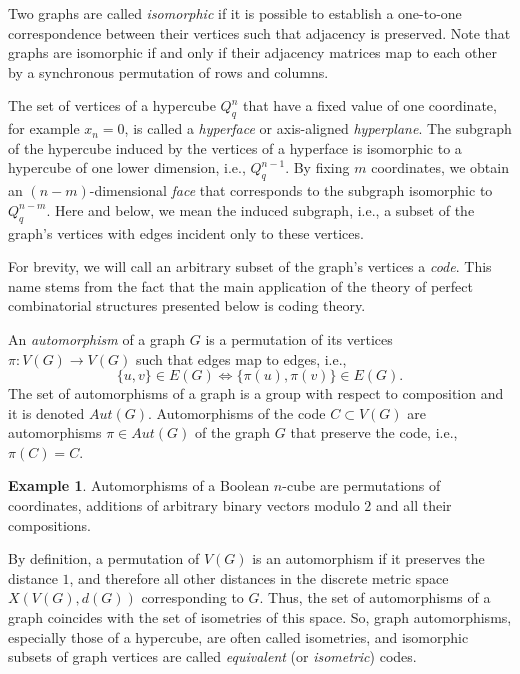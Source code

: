 \documentclass[11pt]{article}
\theoremstyle{definition}
\newtheorem{example}{Example}[section]
\begin{document}
Two graphs are called {\sl isomorphic} if it is possible to establish
a one-to-one correspondence between their vertices such that
adjacency is preserved. 
Note that graphs are isomorphic if and only if their adjacency matrices map to each other by a synchronous permutation of rows and columns.

The set of vertices of a hypercube $Q_q^n$ that have a fixed value
of one coordinate, for example $x_n=0$, is called a {\sl hyperface} or axis-aligned {\sl hyperplane}.
The subgraph of the hypercube induced by the vertices of a hyperface is isomorphic
to a hypercube of one lower dimension, i.e., $Q_q^{n-1}$.
By fixing $m$ coordinates, we obtain an $(n-m)$-dimensional  {\sl face} that corresponds to the subgraph isomorphic to 
$Q^{n-m}_q$. Here and below,
we mean the induced subgraph, i.e., a subset of the graph's vertices
with edges  incident only to these vertices.

For brevity, we will call an arbitrary subset of the graph's vertices
a {\sl code}. This name stems from the fact that the main
application of the theory of perfect combinatorial structures presented below is
coding theory.


An {\sl automorphism} of a graph $G$ is a permutation of its
vertices $\pi:V(G)\rightarrow V(G)$ such that edges map to
edges, i.e., $$\{u,v\}\in E(G) \Leftrightarrow \{\pi(u),\pi(v)\}\in
E(G).$$%
The set of automorphisms of a graph is a group with respect to composition  and it is denoted
$Aut(G)$.
{Automorphisms of the code} $C\subset V(G)$
are automorphisms $\pi\in Aut(G)$ of the graph $G$ that preserve the code,
i.e., $\pi(C)=C$.

\begin{example}
Automorphisms of a Boolean $n$-cube are permutations of coordinates, additions  of arbitrary binary vectors  modulo $2$ and all their compositions.
\end{example}


By  definition, a permutation of  $V(G)$ is an automorphism  if  it  preserves the distance $1$, and therefore
all other distances in the discrete
metric space  $X(V(G),d(G))$  corresponding to $G$.
Thus, the set of automorphisms of a graph coincides with the set
of isometries of this space. So, graph automorphisms, especially those of a hypercube, are often called isometries, and isomorphic subsets
of graph vertices are called {\sl equivalent} (or {\sl isometric})  codes.
\end{document}
